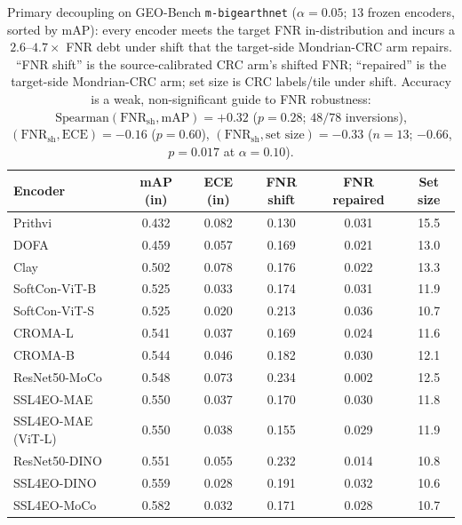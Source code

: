 \documentclass[journal]{IEEEtran}
\renewcommand{\_}{\textunderscore\allowbreak}
\begin{document}
\begin{table}[!t]\centering\small
\caption{Primary decoupling on GEO-Bench \texttt{m-bigearthnet} ($\alpha{=}0.05$; $13$ frozen encoders,
sorted by mAP): every encoder meets the target FNR in-distribution and incurs a $2.6$--$4.7\times$ FNR
debt under shift that the target-side Mondrian-CRC arm repairs. ``FNR shift'' is the source-calibrated
CRC arm's shifted FNR; ``repaired'' is the target-side Mondrian-CRC arm; set size is CRC labels/tile under
shift. Accuracy is a weak, non-significant guide to FNR robustness:
$\mathrm{Spearman}(\mathrm{FNR}_{\mathrm{sh}},\mathrm{mAP})=+0.32$ ($p{=}0.28$; $48/78$ inversions),
$(\mathrm{FNR}_{\mathrm{sh}},\mathrm{ECE})=-0.16$ ($p{=}0.60$),
$(\mathrm{FNR}_{\mathrm{sh}},\text{set size})=-0.33$ ($n{=}13$; $-0.66$, $p{=}0.017$ at
$\alpha{=}0.10$).}\label{tab:fnrdecouple}
\begin{tabular}{lccccc}
\toprule
Encoder & mAP (in) & ECE (in) & FNR shift & FNR repaired & Set size \\
\midrule
Prithvi              & 0.432 & 0.082 & 0.130 & 0.031 & 15.5 \\
DOFA                 & 0.459 & 0.057 & 0.169 & 0.021 & 13.0 \\
Clay                 & 0.502 & 0.078 & 0.176 & 0.022 & 13.3 \\
SoftCon-ViT-B        & 0.525 & 0.033 & 0.174 & 0.031 & 11.9 \\
SoftCon-ViT-S        & 0.525 & 0.020 & 0.213 & 0.036 & 10.7 \\
CROMA-L              & 0.541 & 0.037 & 0.169 & 0.024 & 11.6 \\
CROMA-B              & 0.544 & 0.046 & 0.182 & 0.030 & 12.1 \\
ResNet50-MoCo        & 0.548 & 0.073 & 0.234 & 0.002 & 12.5 \\
SSL4EO-MAE           & 0.550 & 0.037 & 0.170 & 0.030 & 11.8 \\
SSL4EO-MAE (ViT-L)   & 0.550 & 0.038 & 0.155 & 0.029 & 11.9 \\
ResNet50-DINO        & 0.551 & 0.055 & 0.232 & 0.014 & 10.8 \\
SSL4EO-DINO          & 0.559 & 0.028 & 0.191 & 0.032 & 10.6 \\
SSL4EO-MoCo          & 0.582 & 0.032 & 0.171 & 0.028 & 10.7 \\
\bottomrule
\end{tabular}
\end{table}
\end{document}
